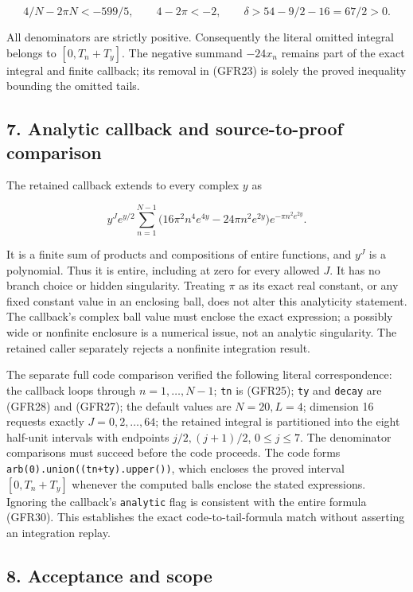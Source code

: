 \[
4/N-2\pi N<-599/5,\qquad
4-2\pi<-2,\qquad
\delta>54-9/2-16=67/2>0.
\tag{GFR29}
\]

All denominators are strictly positive. Consequently the literal omitted integral belongs to \([0,T_n+T_y]\). The negative summand \(-24x_n\) remains part of the exact integral and finite callback; its removal in (GFR23) is solely the proved inequality bounding the omitted tails.

\subsection{7. Analytic callback and source-to-proof comparison}\label{analytic-callback-and-source-to-proof-comparison}

The retained callback extends to every complex \(y\) as

\[
y^Je^{y/2}\sum_{n=1}^{N-1}
\bigl(16\pi^2n^4e^{4y}-24\pi n^2e^{2y}\bigr)
 e^{-\pi n^2e^{2y}}.
\tag{GFR30}
\]

It is a finite sum of products and compositions of entire functions, and \(y^J\) is a polynomial. Thus it is entire, including at zero for every allowed \(J\). It has no branch choice or hidden singularity. Treating \(\pi\) as its exact real constant, or any fixed constant value in an enclosing ball, does not alter this analyticity statement. The callback's complex ball value must enclose the exact expression; a possibly wide or nonfinite enclosure is a numerical issue, not an analytic singularity. The retained caller separately rejects a nonfinite integration result.

The separate full code comparison verified the following literal correspondence: the callback loops through \(n=1,\ldots,N-1\); \nolinkurl{tn} is (GFR25); \nolinkurl{ty} and \nolinkurl{decay} are (GFR28) and (GFR27); the default values are \(N=20,L=4\); dimension 16 requests exactly \(J=0,2,\ldots,64\); the retained integral is partitioned into the eight half-unit intervals with endpoints \(j/2,(j+1)/2\), \(0\le j\le7\). The denominator comparisons must succeed before the code proceeds. The code forms \passthrough{\lstinline!arb(0).union((tn+ty).upper())!}, which encloses the proved interval \([0,T_n+T_y]\) whenever the computed balls enclose the stated expressions. Ignoring the callback's \nolinkurl{analytic} flag is consistent with the entire formula (GFR30). This establishes the exact code-to-tail-formula match without asserting an integration replay.

\subsection{8. Acceptance and scope}\label{acceptance-and-scope}

